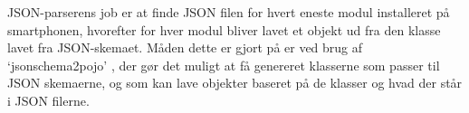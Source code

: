 JSON-parserens job er at finde JSON filen for hvert eneste modul installeret på smartphonen, hvorefter for hver modul bliver lavet et objekt ud fra den klasse lavet fra JSON-skemaet.
Måden dette er gjort på er ved brug af `jsonschema2pojo' \citep{jsonpojo}, der gør det muligt at få genereret klasserne som passer til JSON skemaerne, og som kan lave objekter baseret på de klasser og hvad der står i JSON filerne. 